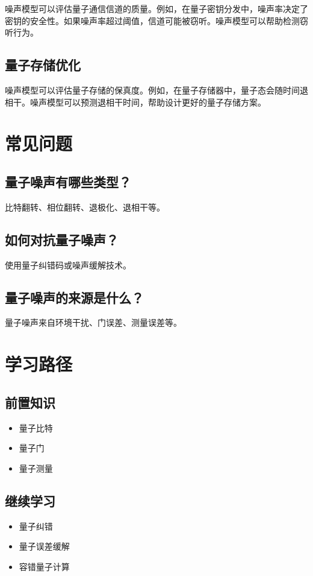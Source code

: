 \documentclass[12pt,a4paper]{article}
\begin{document}
噪声模型可以评估量子通信信道的质量。例如，在量子密钥分发中，噪声率决定了密钥的安全性。如果噪声率超过阈值，信道可能被窃听。噪声模型可以帮助检测窃听行为。

\subsection{量子存储优化}

噪声模型可以评估量子存储的保真度。例如，在量子存储器中，量子态会随时间退相干。噪声模型可以预测退相干时间，帮助设计更好的量子存储方案。

\section{常见问题}

\subsection{量子噪声有哪些类型？}

比特翻转、相位翻转、退极化、退相干等。

\subsection{如何对抗量子噪声？}

使用量子纠错码或噪声缓解技术。

\subsection{量子噪声的来源是什么？}

量子噪声来自环境干扰、门误差、测量误差等。

\section{学习路径}

\subsection{前置知识}
\begin{itemize}
  \item 量子比特
  \item 量子门
  \item 量子测量
\end{itemize}

\subsection{继续学习}
\begin{itemize}
  \item 量子纠错
  \item 量子误差缓解
  \item 容错量子计算
\end{itemize}
\end{document}
